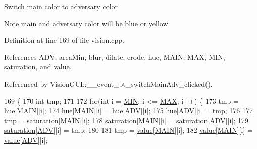 Switch main color to adversary color \begin{DoxyNote}{Note}
main and adversary color will be blue or yellow. 
\end{DoxyNote}


Definition at line 169 of file vision.\+cpp.



References A\+DV, area\+Min, blur, dilate, erode, hue, M\+A\+IN, M\+AX, M\+IN, saturation, and value.



Referenced by Vision\+G\+U\+I\+::\+\_\+\+\_\+event\+\_\+bt\+\_\+switch\+Main\+Adv\+\_\+clicked().


\begin{DoxyCode}
169                                \{
170     \textcolor{keywordtype}{int} tmp;
171 
172     \textcolor{keywordflow}{for}(\textcolor{keywordtype}{int} i = \hyperlink{class_vision_a3824e4ab6a6c9beaceec70f7d3910ed0}{MIN}; i <= \hyperlink{class_vision_af96e82ce8807b3c5e0651f84a04eeb9a}{MAX}; i++) \{
173         tmp = \hyperlink{class_vision_a557114ed93889df7c09fe7add7a2fa1f}{hue}[\hyperlink{class_vision_ae7d1888ee66883aabbdfc7390d338367}{MAIN}][i];
174         \hyperlink{class_vision_a557114ed93889df7c09fe7add7a2fa1f}{hue}[\hyperlink{class_vision_ae7d1888ee66883aabbdfc7390d338367}{MAIN}][i] = \hyperlink{class_vision_a557114ed93889df7c09fe7add7a2fa1f}{hue}[\hyperlink{class_vision_ac1903844090d6721f5c854621c516d8f}{ADV}][i];
175         \hyperlink{class_vision_a557114ed93889df7c09fe7add7a2fa1f}{hue}[\hyperlink{class_vision_ac1903844090d6721f5c854621c516d8f}{ADV}][i] = tmp;
176 
177         tmp = \hyperlink{class_vision_a71a7f9859283e916a0dfb1467eaf5b13}{saturation}[\hyperlink{class_vision_ae7d1888ee66883aabbdfc7390d338367}{MAIN}][i];
178         \hyperlink{class_vision_a71a7f9859283e916a0dfb1467eaf5b13}{saturation}[\hyperlink{class_vision_ae7d1888ee66883aabbdfc7390d338367}{MAIN}][i] = \hyperlink{class_vision_a71a7f9859283e916a0dfb1467eaf5b13}{saturation}[\hyperlink{class_vision_ac1903844090d6721f5c854621c516d8f}{ADV}][i];
179         \hyperlink{class_vision_a71a7f9859283e916a0dfb1467eaf5b13}{saturation}[\hyperlink{class_vision_ac1903844090d6721f5c854621c516d8f}{ADV}][i] = tmp;
180 
181         tmp = \hyperlink{class_vision_ad76f296d21c0758ed68429ca8b237b03}{value}[\hyperlink{class_vision_ae7d1888ee66883aabbdfc7390d338367}{MAIN}][i];
182         \hyperlink{class_vision_ad76f296d21c0758ed68429ca8b237b03}{value}[\hyperlink{class_vision_ae7d1888ee66883aabbdfc7390d338367}{MAIN}][i] = \hyperlink{class_vision_ad76f296d21c0758ed68429ca8b237b03}{value}[\hyperlink{class_vision_ac1903844090d6721f5c854621c516d8f}{ADV}][i];

\end{DoxyCode}
